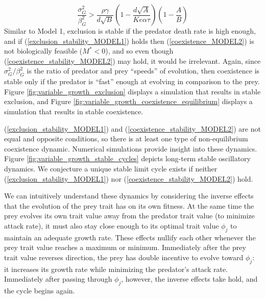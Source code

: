 \documentclass{amsart}
\theoremstyle{definition}
\theoremstyle{remark}
\numberwithin{equation}{section}
\begin{document}
\begin{equation}
	\label{coexistence_stability_MODEL2}
	\frac{\sigma_G^2}{\beta_G^2} > \frac{\rho\gamma}{d\sqrt{B}}\left(1 - \frac{d\sqrt{A}}{Ke\alpha\tau}\right)\left(1 - \frac{A}{B}\right)
\end{equation}
Similar to Model 1, exclusion is stable if the predator death rate is high enough, and if (\ref{exclusion_stability_MODEL1}) holds then (\ref{coexistence_MODEL2}) is not biologically feasible ($M^* < 0$), and so even though (\ref{coexistence_stability_MODEL2}) may hold, it would be irrelevant.  Again, since $\sigma_G^2/\beta_G^2$ is the ratio of predator and prey ``speeds'' of evolution, then coexistence is stable only if the predator is ``fast'' enough at evolving in comparison to the prey.  Figure \ref{fig:variable_growth_exclusion} displays a simulation that results in stable exclusion, and Figure \ref{fig:variable_growth_coexistence_equilibrium} displays a simulation that results in stable coexistence.

(\ref{exclusion_stability_MODEL1}) and (\ref{coexistence_stability_MODEL2}) are not equal and opposite conditions, so there is at least one type of non-equilibrium coexistence dynamic.  Numerical simulations provide insight into these dynamics.  Figure \ref{fig:variable_growth_stable_cycles} depicts long-term stable oscillatory dynamics.  We conjecture a unique stable limit cycle exists if neither (\ref{exclusion_stability_MODEL1}) nor (\ref{coexistence_stability_MODEL2}) hold.

We can intuitively understand these dynamics by considering the inverse effects that the evolution of the prey trait has on its own fitness.  At the same time the prey evolves its own trait value away from the predator trait value (to minimize attack rate), it must also stay close enough to its optimal trait value $\phi_j$ to maintain an adequate growth rate.  These effects nullify each other whenever the prey trait value reaches a maximum or minimum.  Immediately after the prey trait value reverses direction, the prey has double incentive to evolve toward $\phi_j$: it increases its growth rate while minimizing the predator's attack rate.  Immediately after passing through $\phi_j$, however, the inverse effects take hold, and the cycle begins again.
\end{document}
